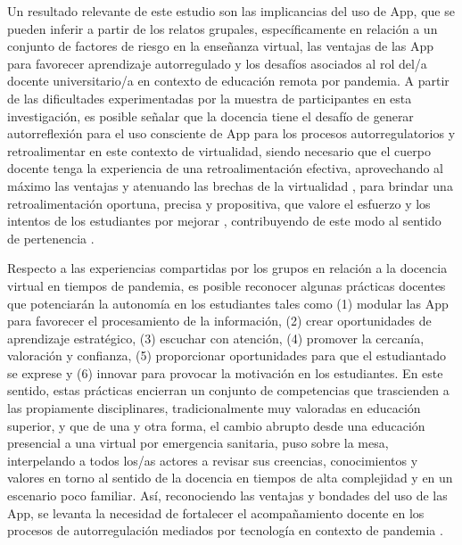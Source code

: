 \documentclass[spanish]{textolivre}
\begin{document}
Un resultado relevante de este estudio son las implicancias del uso de App, que se pueden inferir a partir de los relatos grupales, específicamente  en relación a un conjunto de factores de riesgo en la enseñanza virtual, las   ventajas  de las App para favorecer aprendizaje autorregulado y los desafíos asociados al rol del/a docente universitario/a en contexto de educación remota por  pandemia. A partir de las dificultades experimentadas por la muestra de participantes en esta investigación, es posible señalar que la docencia tiene el desafío de generar autorreflexión para el uso consciente de App para los procesos autorregulatorios y retroalimentar \cite[p. 272]{valencia-serrano2020} en este contexto de virtualidad, siendo  necesario que el cuerpo docente tenga la experiencia de una retroalimentación efectiva, aprovechando al máximo las ventajas y atenuando las brechas de la virtualidad \cite[p. 54]{instituto_internacional_para_la_educacion_superior_en_america_latina_y_el_caribe_covid-19_2020},  para  brindar una retroalimentación  oportuna, precisa y propositiva, que valore el esfuerzo y los intentos de los  estudiantes por mejorar \cite[p. 74]{dapelo2021}, contribuyendo de este modo al sentido de pertenencia \cite{masika2016}. 

Respecto a las experiencias compartidas por los grupos en relación a la docencia virtual en tiempos de pandemia, es posible reconocer algunas prácticas docentes que potenciarán la autonomía en los estudiantes  tales como (1) modular las App para favorecer el procesamiento de la información, (2) crear oportunidades de aprendizaje estratégico, (3) escuchar con atención, (4) promover la cercanía, valoración y confianza, (5) proporcionar oportunidades para que el estudiantado se exprese y (6) innovar para provocar la motivación en los  estudiantes. En este sentido, estas prácticas encierran un conjunto de competencias que trascienden a las propiamente disciplinares,  tradicionalmente muy valoradas  en educación superior, y que de una y otra forma, el cambio abrupto desde una educación presencial a una  virtual  por  emergencia sanitaria, puso  sobre la mesa, interpelando a todos los/as actores a revisar sus creencias, conocimientos y valores en torno al sentido de la docencia en tiempos de alta complejidad y en un escenario poco familiar. Así, reconociendo las ventajas y bondades del uso de las App, se levanta la necesidad de fortalecer el acompañamiento docente en los procesos de autorregulación mediados por tecnología en contexto de pandemia \cite{diazmujica2017, ninocarrasco2019}.
\end{document}
